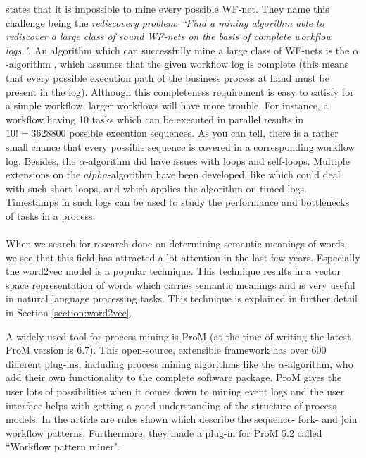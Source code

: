 \documentclass[a4paper,11pt]{article}
\begin{document}
\cite{VanDerAalst2002} states that it is impossible to mine every possible WF-net. They name this challenge being the \textit{rediscovery problem}: \textit{``Find a mining algorithm able to rediscover a large class of sound WF-nets on the basis of complete workflow logs."}\cite{VanDerAalst2002}. An algorithm which can successfully mine a large class of WF-nets is the $\alpha$-algorithm \cite{VanderAalst2003,VanDerAalst2002,VanderAalst2002TimedLogs}, which assumes that the given workflow log is complete (this means that every possible execution path of the business process at hand must be present in the log). Although this completeness requirement is easy to satisfy for a simple workflow, larger workflows will have more trouble. For instance, a workflow having 10 tasks which can be executed in parallel results in $10!=3628800$ possible execution sequences. As you can tell, there is a rather small chance that every possible sequence is covered in a corresponding workflow log. Besides, the $\alpha$-algorithm did have issues with loops and self-loops. Multiple extensions on the $alpha$-algorithm have been developed. like \cite{A+-algorithm2004} which could deal with such short loops, and \cite{VanderAalst2002TimedLogs} which applies the algorithm on timed logs. Timestamps in such logs can be used to study the performance and bottlenecks of tasks in a process.\\
\\



When we search for research done on determining semantic meanings of words, we see that this field has attracted a lot attention in the last few years. Especially the word2vec model \cite{Mikolov2013a,Mikolov2013b} is a popular technique. This technique results in a vector space representation of words which carries semantic meanings and is very useful in natural language processing tasks. This technique is explained in further detail in Section \ref{section:word2vec}.

A widely used tool for process mining is ProM \cite{ProM6} (at the time of writing the latest ProM version is 6.7). This open-source, extensible framework has over 600 different plug-ins, including process mining algorithms like the $\alpha$-algorithm, who add their own functionality to the complete software package. ProM gives the user lots of possibilities when it comes down to mining event logs and the user interface helps with getting a good understanding of the structure of process models. In the article \cite{WorkflowMiner2006} are rules shown which describe the sequence- fork- and join workflow patterns. Furthermore, they made a plug-in for ProM 5.2 called ``Workflow pattern miner". 
\end{document}
